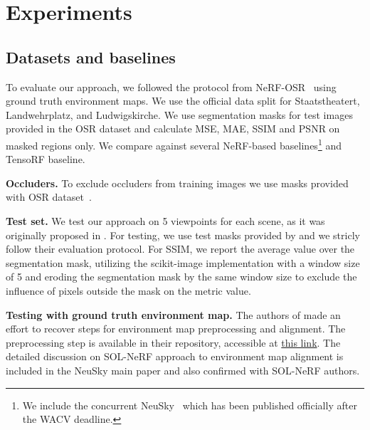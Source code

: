 


\section{Experiments}
  \label{sec:lumigauss-experiments}


  \subsection{Datasets and baselines}
    To evaluate our approach, we followed the protocol from
    NeRF-OSR~\cite{rudnev2022nerfosr} using ground truth environment maps.
    We use the official data split for Staatstheatert, Landwehrplatz, and
    Ludwigskirche.
    We use segmentation masks for test images provided in the OSR dataset and
    calculate MSE, MAE, SSIM and PSNR on masked regions only.
    We compare \lumigauss against several NeRF-based baselines\footnote{We include
      the concurrent NeuSky~\cite{gardner2023neusky} which has been published
      officially after the WACV deadline.
    } and TensoRF baseline.

    \noindent\textbf{Occluders.}
    To exclude occluders from training images we use masks provided with OSR
    dataset~\cite{rudnev2022nerfosr}.

    \noindent\textbf{Test set.}
    We test our approach on 5 viewpoints for each scene, as it was originally
    proposed in \cite{rudnev2022nerfosr}.
    For testing, we use test masks provided by \cite{rudnev2022nerfosr} and we
    stricly follow their evaluation protocol.
    For SSIM, we report the average value over the segmentation mask, utilizing
    the scikit-image implementation with a window size of 5 and eroding the
    segmentation mask by the same window size to exclude the influence of pixels
    outside the mask on the metric value.

    \noindent\textbf{Testing with ground truth environment map.}
    The authors of \cite{gardner2023neusky} made an effort to recover steps for
    environment map preprocessing and alignment.
    The preprocessing step is available in their repository, accessible at
    \href{https://github.com/JADGardner/neusky/blob/main/notebooks/nerfosr_envmaps.ipynb}{this
      link}.
    The detailed discussion on SOL-NeRF \cite{solnerf} approach to environment map
    alignment is included in the NeuSky main paper \cite{gardner2023neusky} and
    also confirmed with SOL-NeRF authors.

